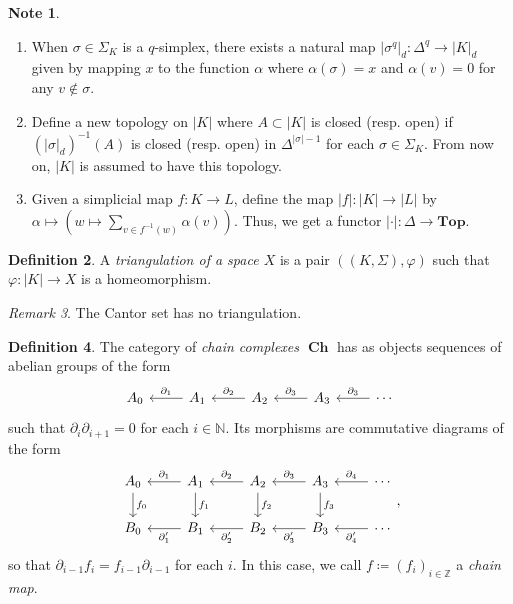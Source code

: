 \documentclass[10pt,letterpaper,cm]{nupset}
\theoremstyle{definition}
\newtheorem{definition}{Definition}[subsection]
\newtheorem{note}[definition]{Note}
\theoremstyle{theorem}
\theoremstyle{remark}
\newtheorem{remark}[definition]{Remark}
\newcommand{\N}{\mathbb N}
\newcommand{\Z}{\mathbb Z}
\newcommand{\1}{\mathbb{1}}
\newcommand{\0}{\vec 0}
\DeclareMathOperator{\ch}{\mathbf{Ch}}
\begin{document}
\begin{note} $ $
\begin{enumerate}
\item When $\sigma \in \Sigma_K$ is a $q$-simplex, there exists a natural map $\left\lvert{\sigma^q}\right\rvert_d : \Delta^q \to \left\lvert{K}\right\rvert_d$  given by mapping $x$ to the function $\alpha$ where $\alpha(\sigma) =x$ and $\alpha(v) = 0$ for any $v\notin \sigma$.  
\item Define a new topology on $\left\lvert{K}\right\rvert$ where $A\subset \left\lvert{K}\right\rvert$ is closed (resp. open) if $\left(\left\lvert{\sigma}\right\rvert_d\right)^{-1}(A)$ is closed (resp. open) in $\Delta^{\left\lvert{\sigma}\right\rvert -1}$ for each $\sigma \in \Sigma_K$. From now on, $\left\lvert{K}\right\rvert$ is assumed to have this topology. 
\item Given a simplicial map $f: K \to L$, define the map $\left\lvert{f}\right\rvert : \left\lvert{K}\right\rvert \to \left\lvert{L}\right\rvert$ by $\alpha \mapsto \left(w \mapsto \sum_{v\in f^{-1}(w)} \alpha(v)\right)$. Thus, we get a functor $\left\lvert{\cdot}\right\rvert : \Delta \to \mathbf{Top}$.
\end{enumerate}
\end{note}

\begin{definition}
A \textit{triangulation of a space $X$} is a pair $\left(\left(K, \Sigma\right), \varphi\right)$ such that $\varphi : \left\lvert{K}\right\rvert \to X$ is a homeomorphism. 
\end{definition}

\begin{remark}
The Cantor set has no triangulation. 
\end{remark}

\begin{definition}
The category of \textit{chain complexes $\ch$} has as objects sequences of abelian groups of the form 
\[
\begin{tikzcd}
A_0 & A_1 \arrow[l, "\partial_1"'] & A_2 \arrow[l, "\partial_2"'] & A_3 \arrow[l, "\partial_3"'] & \cdots \arrow[l, "\partial_3"']
\end{tikzcd}
\] such that $\partial_i\partial_{i+1} =0$ for each $i\in \N$. Its morphisms are commutative diagrams of the form
\[
\begin{tikzcd}
A_0 \arrow[d, "f_0"] & A_1 \arrow[l, "\partial_1"'] \arrow[d, "f_1"] & A_2 \arrow[l, "\partial_2"'] \arrow[d, "f_2"] & A_3 \arrow[l, "\partial_3"'] \arrow[d, "f_3"] & \cdots \arrow[l, "\partial_4"'] \\
B_0 & B_1 \arrow[l, "\partial'_1"] & B_2 \arrow[l, "\partial'_2"] & B_3 \arrow[l, "\partial'_3"] & \cdots \arrow[l, "\partial'_4"]
\end{tikzcd}
,\] so that  $\partial_{i-1}f_i = f_{i-1}\partial_{i-1}$ for each $i$. In this case, we call $f\coloneqq  \left(f_i\right)_{i\in \Z}$ a \textit{chain map}.
\end{definition}
\end{document}
